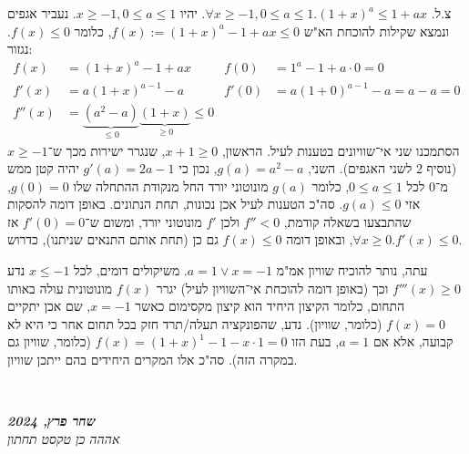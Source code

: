 \documentclass[]{article}
\newcommand\ndoc  {\dotfill \\ \vfil {\begin{center} {\textbf{\textit{שחר פרץ, 2024}} \\ \scriptsize \textit{אההה כן טקסט תחתון}} \end{center}} \vfil	}
\begin{document}
	\section{}
	צ.ל. $\forall x \ge -1, 0 \le a \le 1. (1 + x)^{a} \le 1 + ax$. יהיו $x \ge -1, 0 \le a \le 1$. נעביר אגפים ונמצא שקילות להוכחת הא"ש $f(x) := (1 + x)^a - 1 + ax \le 0$, כלומר $f(x) \le 0$. נגזור: 
	\begin{align*}
		f(x) &= (1 + x)^a - 1 + ax & f(0) &= 1^a - 1 + a \cdot 0 = 0 \\
		f'(x) &= a(1 + x)^{a - 1} - a & f'(0) &= a(1 + 0)^{a - 1} - a = a - a = 0 \\
		f''(x) &= \underbrace{(a^2 - a)}_{\le 0}\underbrace{(1 + x)}_{\ge 0} \le 0
	\end{align*}
	הסתמכנו שני אי־שוויונים בטענות לעיל. הראשון, $x + 1 \ge 0$, שנגרר ישירות מכך ש־$x \ge -1$ (נוסיף 2 לשני האגפים). השני, $g(a) = a^2 - a$, נכון כי $g'(a) = 2a - 1 $ יהיה קטן ממש מ־$0$ לכל $0 \le a \le 1$, כלומר $g(a)$ מונוטוני יורד החל מנקודת ההתחלה שלו $g(0) = 0$, אזי $g(a) \le 0$. סה"כ הטענות לעיל אכן נכונות, תחת הנתונים. באופן דומה להסקות שהתבצעו בשאלה קודמת, $f'' < 0 $ ולכן $f'$ מונוטוני יורד, ומשום ש־$f'(0) = 0$ אז $\forall x \ge 0. f'(x) \le 0$, ובאופן דומה $f(x) \le 0$ גם כן (תחת אותם התנאים שניתנו), כדרוש. 
	
	עתה, נותר להוכיח שוויון אמ"מ $a = 1 \lor x = -1$. משיקולים דומים, לכל $x \le -1$ נדע $f'''(x) \ge 0$ וכך (באופן דומה להוכחת אי־השוויון לעיל) יגרר $f(x)$ מונוטונית עולה באותו התחום, כלומר הקיצון היחיד הוא קיצון מקסימום כאשר $x = -1$, שם אכן יתקיים $f(x) = 0$ (כלומר, שוויון). נדע, שהפונקציה תעלה/תרד חזק בכל תחום אחר כי היא לא קבועה, אלא אם $a = 1$, בעת הזו $f(x) = (1 + x)^1 - 1 - x \cdot 1 = 0$ (כלומר, שוויון גם במקרה הזה). סה"כ אלו המקרים היחידים בהם ייתכן שוויון. 

	
	
	\ndoc
\end{document}
